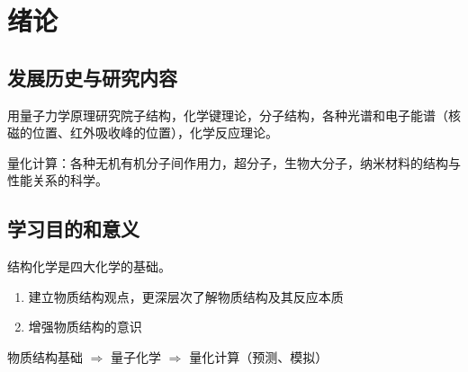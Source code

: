 
\chapter{绪论}
\section{发展历史与研究内容}

用量子力学原理研究院子结构，化学键理论，分子结构，各种光谱和电子能谱（核磁的位置、红外吸收峰的位置），化学反应理论。

量化计算：各种无机有机分子间作用力，超分子，生物大分子，纳米材料的结构与性能关系的科学。

\section{学习目的和意义}

结构化学是四大化学的基础。

\begin{enumerate}
    \item 建立物质结构观点，更深层次了解物质结构及其反应本质
    \item 增强物质结构的意识
\end{enumerate}

物质结构基础 $\Rightarrow$ 量子化学 $\Rightarrow$ 量化计算（预测、模拟）
